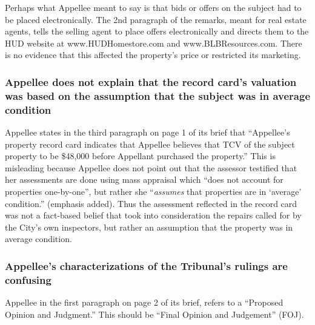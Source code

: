 \documentclass[12pt,\documentclassflag]{michiganCourtOfAppealsBrief}
\begin{document}
Perhaps what Appellee meant to say is that bids or offers on the subject had to be placed electronically. The 2nd paragraph of the remarks, meant for real estate agents, tells the selling agent to place offers electronically and directs them to the HUD website at www.HUDHomestore.com and www.BLBResources.com. There is no evidence that this affected the property's price or restricted its marketing.


\subsubsection{Appellee does not explain that the record card's valuation was based on the assumption that the subject was in average condition}

Appellee states in the third paragraph on page 1 of its brief that ``Appellee's property record card indicates that Appellee believes that TCV of the subject property to be \$48,000 before Appellant purchased the property.'' This is misleading because Appellee does not point out that the assessor testified that her assessments are done using mass appraisal which ``does not account for properties one-by-one'', but rather she ``{\em assumes} that properties are in `average' condition.'' \foj[4] (emphasis added). Thus the assessment reflected in the record card was not a fact-based belief that took into consideration the repairs called for by the City's own inspectors, but rather an assumption that the property was in average condition.

\subsubsection{Appellee's characterizations of the Tribunal's rulings are confusing}

Appellee in the first paragraph on page 2 of its brief, refers to a ``Proposed Opinion and Judgment.'' This should be ``Final Opinion and Judgement'' (FOJ).
\end{document}
